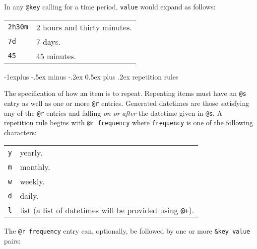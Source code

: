 \documentclass[10pt,landscape]{article}
\makeatletter
\renewcommand{\subsection}{\@startsection{subsection}{2}{0mm}%
                                {-1explus -.5ex minus -.2ex}%
                                {0.5ex plus .2ex}%
                                {\normalfont\normalsize\bfseries}}
\makeatother
\begin{document}
\begin{multicols}{3}
\vskip 3pt
In any \verb!@key! calling for a time period, \verb!value! would expand as follows:
\vskip 3pt

\begin{tabular}{@{}ll@{}}
\texttt{2h30m} & 2 hours and thirty minutes. \\
\texttt{7d} & 7 days. \\
\texttt{45} & 45 minutes. \\
\end{tabular}


\subsection{repetition rules}

The specification of how an item is to repeat. Repeating items must have an \verb!@s! entry as well as one or more \verb!@r! entries. Generated datetimes are those satisfying any of the \verb!@r! entries and falling \emph{on or after} the datetime given in \verb!@s!.
\vskip 3pt
A repetition rule begins with \verb!@r frequency! where \verb!frequency! is one of the following characters:
\vskip 3pt
\begin{tabular}{@{}ll@{}}
\texttt{y} & yearly. \\
\texttt{m} & monthly. \\
\texttt{w} & weekly. \\
\texttt{d} & daily. \\
\texttt{l} & list (a list of datetimes will be provided using \verb!@+!). \\
\end{tabular}

\vskip 3pt
The \verb!@r frequency! entry can, optionally, be followed by one or more
\verb!&key value! pairs:
\vskip 3pt


\end{multicols}
\end{document}
